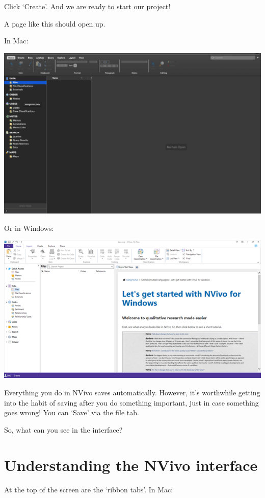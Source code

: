 \documentclass[
]{book}
\begin{document}
Click `Create'. And we are ready to start our project!

A page like this should open up.

In Mac:

\includegraphics{imgs/open_mac.png}

Or in Windows:

\includegraphics{imgs/open_windows.png}

Everything you do in NVivo saves automatically. However, it's worthwhile getting into the habit of saving after you do something important, just in case something goes wrong! You can `Save' via the file tab.

So, what can you see in the interface?

\hypertarget{understanding-the-nvivo-interface}{%
\section{Understanding the NVivo interface}\label{understanding-the-nvivo-interface}}

At the top of the screen are the `ribbon tabs'. In Mac:
\end{document}
